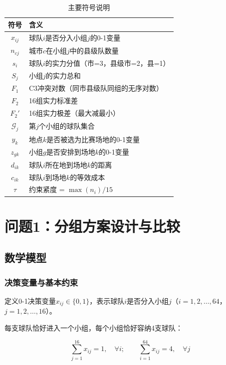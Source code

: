 \documentclass[12pt,a4paper]{article}
\begin{document}
\begin{table}[H]
  \centering
  \caption{主要符号说明}
  \begin{tabular}{cl}
    \toprule
    符号 & 含义 \\
    \midrule
    $x_{ij}$ & 球队$i$是否分入小组$j$的0-1变量 \\
    $n_{cj}$ & 城市$c$在小组$j$中的县级队数量 \\
    $s_i$ & 球队$i$的实力分值（市=3，县级市=2，县=1） \\
    $S_j$ & 小组$j$的实力总和 \\
    $F_1$ & C3冲突对数（同市县级队同组的无序对数） \\
    $F_2$ & 16组实力标准差 \\
    $F_2'$ & 16组实力极差（最大减最小） \\
    $\mathcal{G}_j$ & 第$j$个小组的球队集合 \\
    $y_k$ & 地点$k$是否被选为比赛场地的0-1变量 \\
    $z_{gk}$ & 小组$g$是否安排到场地$k$的0-1变量 \\
    $d_{ik}$ & 球队$i$所在地到场地$k$的距离 \\
    $c_{ik}$ & 球队$i$到场地$k$的等效成本 \\
    $\tau$ & 约束紧度 = $\max(n_i)/15$ \\
    \bottomrule
  \end{tabular}
\end{table}

\section{问题1：分组方案设计与比较}

\subsection{数学模型}

\subsubsection{决策变量与基本约束}

定义0-1决策变量$x_{ij} \in \{0,1\}$，表示球队$i$是否分入小组$j$（$i = 1,2,\dots,64$，$j = 1,2,\dots,16$）。

每支球队恰好进入一个小组，每个小组恰好容纳4支球队：

\begin{equation}
  \sum_{j=1}^{16} x_{ij} = 1,\quad \forall i; \qquad \sum_{i=1}^{64} x_{ij} = 4,\quad \forall j
  \label{eq:assign}
\end{equation}
\end{document}
